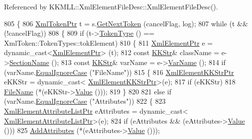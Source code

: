 Referenced by K\+K\+M\+L\+L\+::\+Xml\+Element\+File\+Desc\+::\+Xml\+Element\+File\+Desc().


\begin{DoxyCode}
805 \{
806   \hyperlink{class_k_k_b_1_1_xml_token}{XmlTokenPtr}  t = s.\hyperlink{class_k_k_b_1_1_xml_stream_a87cc738b05c666cf5d5c25beaab477b4}{GetNextToken} (cancelFlag, log);
807   \textcolor{keywordflow}{while}  (t  &&  (!cancelFlag))
808   \{
809     \textcolor{keywordflow}{if}  (t->\hyperlink{class_k_k_b_1_1_xml_token_ae98e2c1a798882647578cae4adcd7176}{TokenType} () == XmlToken::TokenTypes::tokElement)
810     \{
811       \hyperlink{class_k_k_b_1_1_xml_element}{XmlElementPtr}  e = \textcolor{keyword}{dynamic\_cast<}\hyperlink{class_k_k_b_1_1_xml_element}{XmlElementPtr}\textcolor{keyword}{>} (t);
812       \textcolor{keyword}{const} \hyperlink{class_k_k_b_1_1_k_k_str}{KKStr}&  className = e->\hyperlink{class_k_k_b_1_1_xml_element_a2b85dcb37a0f63bd7979d16d12296876}{SectionName} ();
813       \textcolor{keyword}{const} \hyperlink{class_k_k_b_1_1_k_k_str}{KKStr}&  varName = e->\hyperlink{class_k_k_b_1_1_xml_element_aef57cf00be66a3a387ce849b35125f51}{VarName} ();
814       \textcolor{keywordflow}{if}  (varName.\hyperlink{class_k_k_b_1_1_k_k_str_a562f9696417c53f66bc4088eac072ab5}{EqualIgnoreCase} (\textcolor{stringliteral}{"FileName"}))
815       \{
816         \hyperlink{class_k_k_b_1_1_xml_element_k_k_str}{XmlElementKKStrPtr}  eKKStr = \textcolor{keyword}{dynamic\_cast<}
      \hyperlink{class_k_k_b_1_1_xml_element_k_k_str}{XmlElementKKStrPtr}\textcolor{keyword}{>}(e);
817         \textcolor{keywordflow}{if}  (eKKStr)
818           \hyperlink{class_k_k_m_l_l_1_1_file_desc_a5b4f2ac77be5c0d49cbd94eeb463cfed}{FileName} (*(eKKStr->\hyperlink{class_k_k_b_1_1_xml_element_template_a3d671b57251b4b256fecb2197fc4a0f4}{Value} ()));
819       \}
820 
821       \textcolor{keywordflow}{else} \textcolor{keywordflow}{if}  (varName.\hyperlink{class_k_k_b_1_1_k_k_str_a562f9696417c53f66bc4088eac072ab5}{EqualIgnoreCase} (\textcolor{stringliteral}{"Attributes"}))
822       \{
823         \hyperlink{class_k_k_b_1_1_xml_element_template}{XmlElementAttributeListPtr}  eAttributes = \textcolor{keyword}{dynamic\_cast<}
      \hyperlink{class_k_k_b_1_1_xml_element_template}{XmlElementAttributeListPtr}\textcolor{keyword}{>}(e);
824         \textcolor{keywordflow}{if}  (eAttributes  &&  (eAttributes->\hyperlink{class_k_k_b_1_1_xml_element_template_a3d671b57251b4b256fecb2197fc4a0f4}{Value} ()))
825           \hyperlink{class_k_k_m_l_l_1_1_file_desc_a363b1895a649ca759b28dce3c8c3a58a}{AddAttributes} (*(eAttributes->\hyperlink{class_k_k_b_1_1_xml_element_template_a3d671b57251b4b256fecb2197fc4a0f4}{Value} ()));

\end{DoxyCode}
